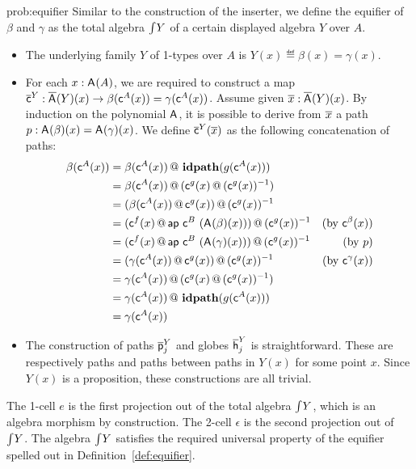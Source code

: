 \begin{construction}{prob:equifier}\label{cons:equifier}
Similar to the construction of the inserter, we define the equifier
of $\beta$ and $\gamma$ as the total algebra $\textstyle \int_{}{Y}$ of a certain
displayed algebra $Y$ over $A$.
\begin{itemize}
\item The underlying family $Y$ of 1-types over $A$ is $Y(x) \eqdef \beta(x) = \gamma(x)$.
\item
For each $x : \mathsf{A}^{}(A)$, we are required to construct
a map $\overline{\mathsf{c}}^{Y} : \overline{\mathsf{A}^{}}(Y)(x) \rightarrow
\beta(\mathsf{c}^{A}(x)) = \gamma (\mathsf{c}^{A}(x))$. Assume given $\overline{x}
: \overline{\mathsf{A}^{}}(Y)(x)$. By induction on the polynomial
$\mathsf{A}^{}$, it is possible to derive from $\overline{x}$ a path $p
: \mathsf{A}^{}(\beta)(x) = \mathsf{A}^{}(\gamma)(x)$.  We
define $\overline{\mathsf{c}}^{Y}(\overline{x})$ as the following concatenation of
paths:
\begin{align*}
\beta(\mathsf{c}^{A}(x))
&= \beta(\mathsf{c}^{A}(x)) \, @ \, \operatorname{\mathbf{idpath}}(g(\mathsf{c}^{A}(x))) \\
&= \beta(\mathsf{c}^{A}(x)) \, @ \, (\mathsf{c}^{g}(x) \, @ \, (\mathsf{c}^{g}(x))^{-1}) \\
&= (\beta(\mathsf{c}^{A}(x)) \, @ \, \mathsf{c}^{g}(x)) \, @ \, (\mathsf{c}^{g}(x))^{-1} \\
&= (\mathsf{c}^{f}(x) \, @ \, \mathsf{ap} \ \mathsf{c}^{B} \ (\mathsf{A}^{}(\beta)(x))) \, @ \, (\mathsf{c}^{g}(x))^{-1}
& \text{(by $\mathsf{c}^{\beta}(x)$)}\\
&= (\mathsf{c}^{f}(x) \, @ \, \mathsf{ap} \ \mathsf{c}^{B} \ (\mathsf{A}^{}(\gamma)(x))) \, @ \, (\mathsf{c}^{g}(x))^{-1}
& \text{(by $p$)}\\
&= (\gamma(\mathsf{c}^{A}(x)) \, @ \, \mathsf{c}^{g}(x)) \, @ \, (\mathsf{c}^{g}(x))^{-1}
& \text{(by $\mathsf{c}^{\gamma}(x)$)}\\
&= \gamma(\mathsf{c}^{A}(x)) \, @ \, (\mathsf{c}^{g}(x) \, @ \, (\mathsf{c}^{g}(x))^{-1}) \\
&= \gamma(\mathsf{c}^{A}(x)) \, @ \, \operatorname{\mathbf{idpath}}(g(\mathsf{c}^{A}(x))) \\
&= \gamma(\mathsf{c}^{A}(x))
\end{align*}
\item The construction of paths $\overline{\mathsf{p}}^{Y}_{j}$ and globes $\overline{\mathsf{h}}^{Y}_{j}$ is
straightforward. These are respectively paths and paths between paths
in $Y(x)$ for some point $x$. Since $Y(x)$ is a proposition,
these constructions are all trivial.
\end{itemize}

The 1-cell $e$ is the first projection out of the total algebra $\textstyle \int_{}{Y}$, which
is an algebra morphism by construction. The 2-cell $\epsilon$ is the
second projection out of $\textstyle \int_{}{Y}$. The algebra $\textstyle \int_{}{Y}$ satisfies the required
universal property of the equifier spelled out in Definition~\ref{def:equifier}.
\end{construction}
